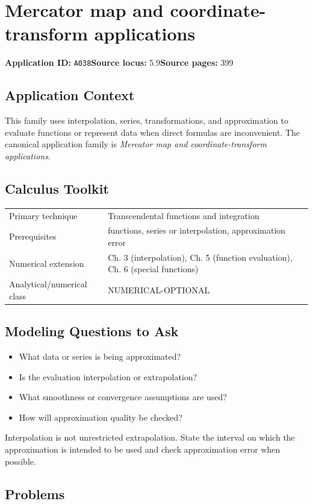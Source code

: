 \documentclass[11pt]{book}
\newcommand{\pid}[1]{\texttt{#1}}
\begin{document}
\chapter{Mercator map and coordinate-transform applications}\label{app:A038}
\textbf{Application ID:} \pid{A038}\quad \textbf{Source locus:} 5.9\quad \textbf{Source pages:} 399
\section*{Application Context}
This family uses interpolation, series, transformations, and approximation to evaluate functions or represent data when direct formulas are inconvenient. The canonical application family is \emph{Mercator map and coordinate-transform applications}.
\section*{Calculus Toolkit}
\begin{tabularx}{\textwidth}{@{}lX@{}}\toprule
Primary technique & Transcendental functions and integration \\
Prerequisites & functions, series or interpolation, approximation error \\
Numerical extension & Ch. 3 (interpolation), Ch. 5 (function evaluation), Ch. 6 (special functions) \\
Analytical/numerical class & NUMERICAL-OPTIONAL \\
\bottomrule\end{tabularx}
\section*{Modeling Questions to Ask}\begin{itemize}
\item What data or series is being approximated?
\item Is the evaluation interpolation or extrapolation?
\item What smoothness or convergence assumptions are used?
\item How will approximation quality be checked?
\end{itemize}
\begin{errorbox}Interpolation is not unrestricted extrapolation. State the interval on which the approximation is intended to be used and check approximation error when possible.\end{errorbox}
\section*{Problems}
\end{document}
